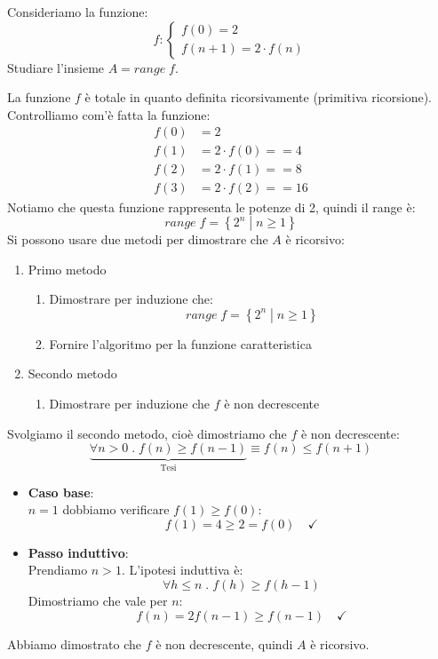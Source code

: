\documentclass[a4paper]{article}
\begin{document}
\begin{example}
  Consideriamo la funzione:
  \[
    f: \begin{cases}
      f(0) = 2\\
      f(n+1) = 2 \cdot f(n)
    \end{cases}
  \] 
  Studiare l'insieme \( A = range\; f \).

  \vspace{1em}
  \noindent
  La funzione \( f \) è totale in quanto definita ricorsivamente (primitiva ricorsione).
  Controlliamo com'è fatta la funzione:
  \[
  \begin{aligned}
    f(0) &= 2\\
    f(1) &= 2 \cdot f(0) = = 4\\
    f(2) &= 2 \cdot f(1) = = 8\\
    f(3) &= 2 \cdot f(2) = = 16
  \end{aligned}
  \] 
  Notiamo che questa funzione rappresenta le potenze di 2, quindi il range è:
  \[
    range\; f = \left\{ \left. 2^n \;\right|\; n \ge 1 \right\}
  \] 
  Si possono usare due metodi per dimostrare che \( A \) è ricorsivo:
  \begin{enumerate}
    \item Primo metodo
      \begin{enumerate}
        \item Dimostrare per induzione che:
          \[
            range\; f = \left\{ \left. 2^n \;\right|\; n \ge 1 \right\}
            \] 

          \item Fornire l'algoritmo per la funzione caratteristica
        \end{enumerate}

      \item Secondo metodo
        \begin{enumerate}
          \item 
            Dimostrare per induzione che \( f \) è non decrescente
        \end{enumerate}
  \end{enumerate}

  \vspace{1em}
  \noindent
  Svolgiamo il secondo metodo, cioè dimostriamo che \( f \) è non decrescente:
  \[
    \underbrace{\forall  n > 0 \;.\; f(n) \ge f(n-1)}_{\text{Tesi}} \equiv f(n) \le f(n+1)
  \] 
  \begin{itemize}
    \item \textbf{Caso base}:\\
      \( n = 1 \) dobbiamo verificare \( f(1) \ge f(0) \):
      \[
        f(1) = 4 \ge 2 = f(0) \quad \checkmark
      \] 

    \item \textbf{Passo induttivo}:\\
      Prendiamo \( n >1 \). L'ipotesi induttiva è:
      \[
        \forall h \le n \;.\; f(h) \ge f(h-1)
      \] 
      Dimostriamo che vale per \( n \):
      \[
        f(n) = 2 f(n-1) \ge f(n-1) \quad \checkmark
      \] 
  \end{itemize}
  Abbiamo dimostrato che \( f \) è non decrescente, quindi \( A \) è ricorsivo.
\end{example}
\end{document}
